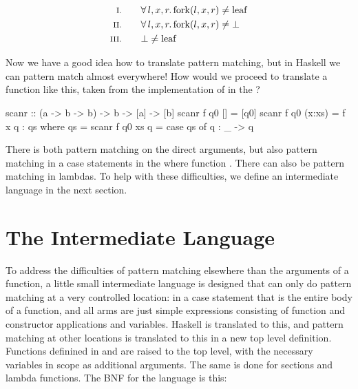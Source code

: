 \begin{align*}
\rom{1} \qquad & \faaa{l}{x}{r} \fn{fork}(l,x,r) \neq \fn{leaf} \\
\rom{2} \qquad & \faaa{l}{x}{r} \fn{fork}(l,x,r) \neq \bot      \\
\rom{3} \qquad & \bot \neq \fn{leaf}
\end{align*}

Now we have a good idea how to translate pattern matching, but
in Haskell we can pattern match almost everywhere! How would we
proceed to translate a function like this, taken from the
implementation of  in the ?

\begin{code}
scanr             :: (a -> b -> b) -> b -> [a] -> [b]
scanr f q0 []     =  [q0]
scanr f q0 (x:xs) =  f x q : qs
                     where qs = scanr f q0 xs
                           q = case qs of
                                 q : _ -> q
\end{code}

\noindent
There is both pattern matching on the direct arguments, but also
pattern matching in a case statements in the where function
. There can also be pattern matching in lambdas. To help with
these difficulties, we define an intermediate language in the next
section.

\section{The Intermediate Language}

To address the difficulties of pattern matching elsewhere than the
arguments of a function, a little small intermediate language is
designed that can only do pattern matching at a very controlled
location: in a case statement that is the entire body of a function,
and all arms are just simple expressions consisting of function and
constructor applications and variables. Haskell is translated to this,
and pattern matching at other locations is translated to this in a new
top level definition. Functions definined in  and 
are raised to the top level, with the necessary variables in scope as
additional arguments. The same is done for sections and lambda
functions. The BNF for the language is this:


